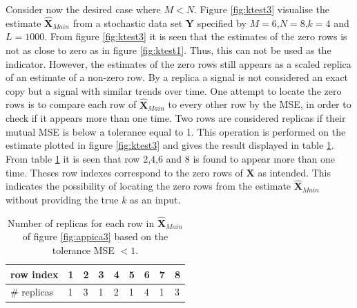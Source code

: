 Consider now the desired case where $M<N$.  
Figure \ref{fig:ktest3} visualise the estimate $\hat{\textbf{X}}_{Main}$ from a stochastic data set $\textbf{Y}$ specified by $M=6$,$N=8$,$k=4$ and $L=1000$.
From figure \ref{fig:ktest3} it is seen that the estimates of the zero rows is not as close to zero as in figure \ref{fig:ktest1}. Thus, this can not be used as the indicator. However, the estimates of the zero rows still appears as a scaled replica of an estimate of a non-zero row. By a replica a signal is not considered an exact copy but a signal with similar trends over time.
One attempt to locate the zero rows is to compare each row of $\hat{\textbf{X}}_{Main}$ to every other row by the MSE, in order to check if it appears more than one time.
Two rows are considered replicas if their mutual MSE is below a tolerance equal to 1. This operation is performed on the estimate plotted in figure \ref{fig:ktest3} and gives the result displayed in table \ref{tab:replica1}.
From table \ref{tab:replica1} it is seen that row 2,4,6 and 8 is found to appear more than one time. Theses row indexes correspond to the zero rows of $\textbf{X}$ as intended. This indicates the possibility of locating the zero rows from the estimate $\hat{\textbf{X}}_{Main}$ without providing the true $k$ as an input.      

\begin{table}[h]
\center
\begin{tabular}{|l|l|l|l|l|l|l|l|l|}
\hline
row index   & 1 & 2 & 3 & 4 & 5 & 6 & 7 & 8 \\ \hline
\# replicas & 1 & 3 & 1 & 2 & 1 & 4 & 1 & 3 \\ \hline
\end{tabular}
\caption{Number of replicas for each row in $\hat{\textbf{X}}_{Main}$ of figure \ref{fig:appica3} based on the tolerance MSE $< 1$. }
\label{tab:replica1}
\end{table}


